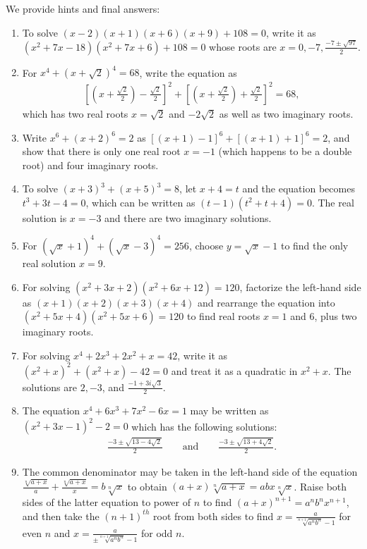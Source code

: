 \begin{solution}
    We provide hints and final answers:
    \begin{enumerate}
        \item To solve $(x-2)(x+1)(x+6)(x+9)+108 = 0$, write it as $(x^2+7x-18)(x^2+7x+6)+108=0$ whose roots are $x=0,-7,\displaystyle\frac{-7\pm \sqrt{97}}{2}$.
        \item For $x^4 + (x+\sqrt 2)^4 = 68$, write the equation as
        \begin{align*}
            \left[\left(x+\frac{\sqrt{2}}{2}\right) - \frac{\sqrt{2}}{2}\right]^2 + \left[\left(x+\frac{\sqrt{2}}{2}\right) + \frac{\sqrt{2}}{2}\right]^2 = 68,
        \end{align*}
        which has two real roots $x=\sqrt 2$ and $-2\sqrt 2$ as well as two imaginary roots.
        \item Write $x^6 + (x+2)^6 = 2$ as $[(x+1)-1]^6 + [(x+1)+1]^6 = 2$, and show that there is only one real root $x=-1$ (which happens to be a double root) and four imaginary roots.
        \item To solve $(x+3)^3+(x+5)^3=8$, let $x+4=t$ and the equation becomes $t^3+3t-4=0$, which can be written as $(t-1)(t^2+t+4)=0$. The real solution is $x=-3$ and there are two imaginary solutions.
        \item For $(\sqrt x + 1)^4 + (\sqrt x - 3)^4 = 256$, choose $y=\sqrt x - 1$ to find the only real solution $x=9$.
        \item For solving $(x^2+3x+2)(x^2+6x+12)=120$, factorize the left-hand side as $(x+1)(x+2)(x+3)(x+4)$ and rearrange the equation into $(x^2+5x+4)(x^2+5x+6)=120$ to find real roots $x=1$ and $6$, plus two imaginary roots.
        \item For solving $x^4+2x^3+2x^2+x=42$, write it as $(x^2+x)^2+(x^2+x)-42=0$ and treat it as a quadratic in $x^2+x$. The solutions are $2, -3$, and $\displaystyle \frac{-1+3i\sqrt{3}}{2}$.
        \item The equation $x^4+6x^3+7x^2-6x=1$ may be written as $(x^2+3x-1)^2 - 2=0$ which has the following solutions:
        \begin{align*}
            \frac{-3\pm \sqrt{13-4\sqrt{2}}}{2} \qquad \text{and} \qquad \frac{-3\pm \sqrt{13+4\sqrt{2}}}{2}.
        \end{align*}
        \item The common denominator may be taken in the left-hand side of the equation $\displaystyle \frac{\sqrt[n]{a+x}}{a} + \frac{\sqrt[n]{a+x}}{x} = b\sqrt[n]{x}$ to obtain $(a+x)\sqrt[n]{a+x}=abx\sqrt[n]{x}$. Raise both sides of the latter equation to power of $n$ to find $(a+x)^{n+1} = a^n b^n x^{n+1}$, and then take the $(n+1)^{th}$ root from both sides to find $x=\displaystyle\frac{a}{\sqrt[n+1]{a^nb^n}-1}$ for even $n$ and $x=\displaystyle\frac{a}{\pm\sqrt[n+1]{a^nb^n}-1}$ for odd $n$.

\end{enumerate}
\end{solution}
